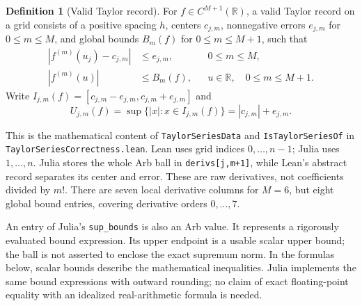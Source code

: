 \documentclass[11pt]{article}
\theoremstyle{definition}
\newtheorem{definition}[theorem]{Definition}
\theoremstyle{remark}
\newcommand{\R}{\mathbb R}
\newcommand{\code}[1]{\nolinkurl{#1}}
\numberwithin{equation}{section}
\begin{document}
\begin{definition}[Valid Taylor record]
\label{def:record}
For $f\in C^{M+1}(\R)$, a valid Taylor record on a grid consists of a
positive spacing $h$, centers $c_{j,m}$, nonnegative errors $e_{j,m}$ for
$0\leq m\leq M$, and global bounds $B_m(f)$ for $0\leq m\leq M+1$, such that
\begin{align}
 |f^{(m)}(u_j)-c_{j,m}|&\leq e_{j,m}, &&0\leq m\leq M,\label{eq:record-grid}\\
 |f^{(m)}(u)|&\leq B_m(f), &&u\in\R,\quad0\leq m\leq M+1.
 \label{eq:record-global}
\end{align}
Write $I_{j,m}(f)=[c_{j,m}-e_{j,m},c_{j,m}+e_{j,m}]$ and
\begin{equation}
 U_{j,m}(f)=\sup\{|x|:x\in I_{j,m}(f)\}=|c_{j,m}|+e_{j,m}.
 \label{eq:U}
\end{equation}
\end{definition}

This is the mathematical content of \code{TaylorSeriesData} and
\code{IsTaylorSeriesOf} in \code{TaylorSeriesCorrectness.lean}. Lean uses
grid indices $0,\ldots,n-1$; Julia uses $1,\ldots,n$. Julia stores the whole
Arb ball in \code{derivs[j,m+1]}, while Lean's abstract record separates
its center and error. These are raw derivatives, not coefficients divided
by $m!$. There are seven local derivative columns for $M=6$, but eight
global bound entries, covering derivative orders $0,\ldots,7$.

An entry of Julia's \code{sup_bounds} is also an Arb value. It represents
a rigorously evaluated bound expression. Its upper endpoint is a usable
scalar upper bound; the ball is not asserted to enclose the exact supremum
norm. In the formulas below, scalar bounds describe the mathematical
inequalities. Julia implements the same bound expressions with outward
rounding; no claim of exact floating-point equality with an idealized
real-arithmetic formula is needed.
\end{document}
